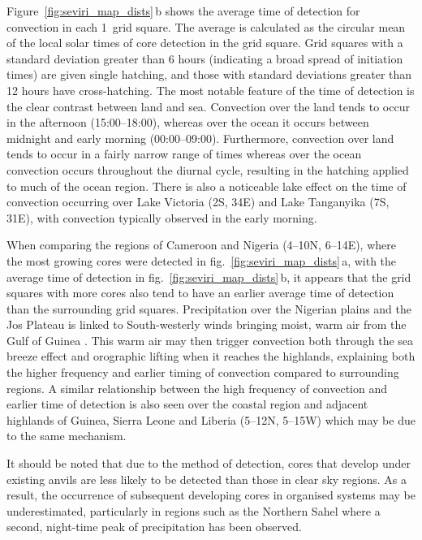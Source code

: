 Figure~\ref{fig:seviri_map_dists}\,b shows the average time of detection for convection in each 1\textdegree\ grid square. 
The average is calculated as the circular mean of the local solar times of core detection in the grid square. 
Grid squares with a standard deviation greater than 6 hours (indicating a broad spread of initiation times) are given single hatching, and those with standard deviations greater than 12 hours have cross-hatching. 
The most notable feature of the time of detection is the clear contrast between land and sea. 
Convection over the land tends to occur in the afternoon (15:00--18:00), whereas over the ocean it occurs between midnight and early morning (00:00--09:00). 
Furthermore, convection over land tends to occur in a fairly narrow range of times whereas over the ocean convection occurs throughout the diurnal cycle, resulting in the hatching applied to much of the ocean region. 
There is also a noticeable lake effect on the time of convection occurring over Lake Victoria (2\textdegree S, 34\textdegree E) and Lake Tanganyika (7\textdegree S, 31\textdegree E), with convection typically observed in the early morning.

When comparing the regions of Cameroon and Nigeria (4--10\textdegree N, 6--14\textdegree E), where the most growing cores were detected in fig.~\ref{fig:seviri_map_dists}\,a, with the average time of detection in fig.~\ref{fig:seviri_map_dists}\,b, it appears that the grid squares with more cores also tend to have an earlier average time of detection than the surrounding grid squares. 
Precipitation over the Nigerian plains and the Jos Plateau is linked to South-westerly winds bringing moist, warm air from the Gulf of Guinea \citep{vondou_seasonal_2010}. 
This warm air may then trigger convection both through the sea breeze effect and orographic lifting when it reaches the highlands, explaining both the higher frequency and earlier timing of convection compared to surrounding regions. 
A similar relationship between the high frequency of convection and earlier time of detection is also seen over the coastal region and adjacent highlands of Guinea, Sierra Leone and Liberia (5--12\textdegree N, 5--15\textdegree W) which may be due to the same mechanism.

It should be noted that due to the method of detection, cores that develop under existing anvils are less likely to be detected than those in clear sky regions. 
As a result, the occurrence of subsequent developing cores in organised systems may be underestimated, particularly in regions such as the Northern Sahel where a second, night-time peak of precipitation has been observed.

